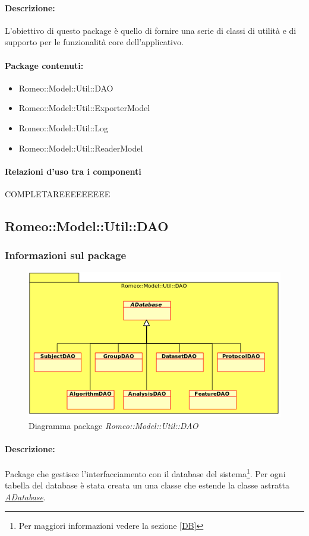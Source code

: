 			\paragraph{Descrizione:}L'obiettivo di questo package\g{} è quello di fornire una serie di classi di utilità e di supporto per le funzionalità core dell'applicativo.
			\paragraph{Package contenuti:}
				\begin{itemize}
					\item Romeo::Model::Util::DAO
					\item Romeo::Model::Util::ExporterModel
					\item Romeo::Model::Util::Log
					\item Romeo::Model::Util::ReaderModel
				\end{itemize}
			\paragraph{Relazioni d'uso tra i componenti}
COMPLETAREEEEEEEEE	\subsection{Romeo::Model::Util::DAO}
		\subsubsection{Informazioni sul package}
			\begin{figure}[!h]
				\centering
				\includegraphics[scale=0.5]{./Content/Immagini/DAO.png}
				\caption{Diagramma package \textsl{Romeo::Model::Util::DAO}}
			\end{figure}
			\paragraph{Descrizione:}Package\g{} che gestisce l'interfacciamento con il database del sistema\footnote{Per maggiori informazioni vedere la sezione \ref{DB}}. Per ogni tabella del database è stata creata un una classe che estende la classe astratta \hyperref[dao::adatabase]{\textsl{ADatabase}}.

